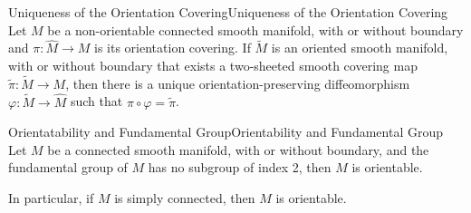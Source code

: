 \documentclass[../main.tex]{subfiles}
\begin{document}
\begin{theorem}{Uniqueness of the Orientation Covering}{Uniqueness of the Orientation Covering}
  Let $M$ be a non-orientable connected smooth manifold, with or without boundary and $\pi: \hat{M} \to M$ is its orientation covering. If $\tilde{M}$ is an oriented smooth manifold, with or without boundary that exists a two-sheeted smooth covering map $\tilde{\pi} : \tilde{M} \to M$, then there is a unique orientation-preserving diffeomorphism $\varphi : \tilde{M} \to \hat{M}$ such that $\pi \circ \varphi = \tilde{\pi}$.
\end{theorem}

\begin{theorem}{Orientatability and Fundamental Group}{Orientability and Fundamental Group}
  Let $M$ be a connected smooth manifold, with or without boundary, and the fundamental group of $M$ has no subgroup of index 2, then $M$ is orientable.

  In particular, if $M$ is simply connected, then $M$ is orientable.  
\end{theorem}
\end{document}
